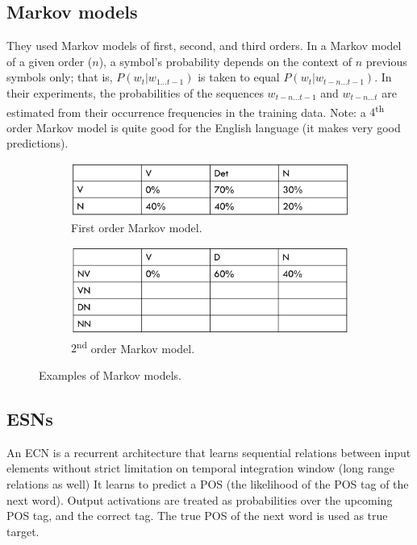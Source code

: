 \subsection{Markov models}
They used Markov models of first, second, and third orders. In a Markov model of a given order ($n$), a symbol's probability depends on the context of $n$ previous symbols only; that is, $P(w_t \vert w_{1\dots t-1})$ is taken to equal $P(w_t \vert w_{t-n\dots t-1})$. In their experiments, the probabilities of the sequences $w_{t-n\dots t-1}$ and $w_{t-n\dots t}$ are estimated from their occurrence frequencies in the training data. Note: a $4$\textsuperscript{th} order Markov model is quite good for the English language (it makes very good predictions).

\begin{figure}[!ht]
    \centering
    \captionsetup{width=.8\linewidth}
    \begin{subfigure}{.49\textwidth}
        \centering
        \includegraphics[width=.9\linewidth]{images/markov.png}
        \caption{First order Markov model.}
    \end{subfigure}
    \begin{subfigure}{.49\textwidth}
        \centering
        \includegraphics[width=.9\linewidth]{images/markov_2.png}
        \caption{$2$\textsuperscript{nd} order Markov model.}
    \end{subfigure}
    \caption{Examples of Markov models.}
    \label{fig:markov}
\end{figure}

\subsection{ESNs}
An ECN is a recurrent architecture that learns sequential relations between input elements without strict limitation on temporal integration window (long range relations as well)
It learns to predict a POS (the likelihood of the POS tag of the next word). Output activations are treated as probabilities over the upcoming POS tag, and the correct tag. The true POS of the next word is used as true target.

